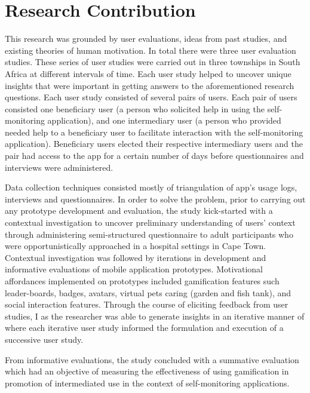 \section{Research Contribution}
This research was grounded by user evaluations, ideas from past studies, and  existing theories of human motivation. In total there were three user evaluation studies. These series of user studies were carried out in three townships in South Africa at different intervals of time. Each user study helped to uncover unique insights that were important in getting answers to the aforementioned research questions. Each user study consisted of several pairs of users. Each pair of users consisted one beneficiary user (a person who solicited help in using the self-monitoring application), and one intermediary user (a person who provided needed help to a beneficiary user to facilitate interaction with the self-monitoring application). Beneficiary users elected their respective intermediary users and the pair had access to the app for a certain number of days before questionnaires and interviews were administered.  

Data collection techniques consisted mostly of triangulation of app's usage logs, interviews and questionnaires. In order to solve the problem, prior to carrying out any prototype development and evaluation, the study kick-started with a contextual investigation to uncover preliminary understanding of users' context through administering semi-structured questionnaire to adult participants who were opportunistically approached in a hospital settings in Cape Town. Contextual investigation was followed by iterations in development and informative evaluations of mobile application prototypes. Motivational affordances implemented on prototypes included gamification features such leader-boards, badges, avatars, virtual pets caring (garden and fish tank), and social interaction features.  Through the course of eliciting feedback from user studies, I as the researcher was able to generate insights in an iterative manner of where each iterative user study informed the formulation and execution of a successive user study. 

From informative evaluations, the study concluded with a summative evaluation which had an objective of measuring the effectiveness of using gamification in promotion of intermediated use in the context of self-monitoring applications. 
 
